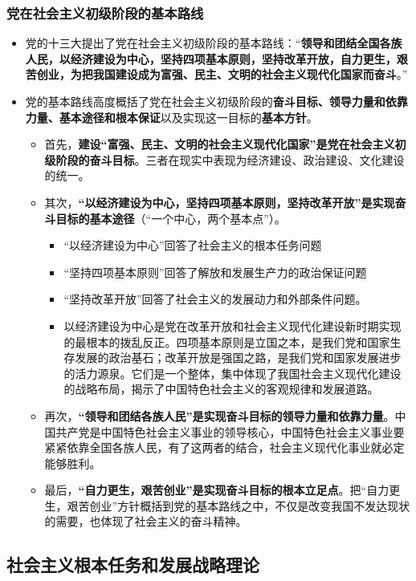 \documentclass[12pt,openany]{ctexbook}
\begin{document}
\subsubsection{党在社会主义初级阶段的基本路线}
\begin{itemize}
  \item 党的十三大提出了党在社会主义初级阶段的基本路线：“\textbf{领导和团结全国各族人民，以经济建设为中心，坚持四项基本原则，坚持改革开放，自力更生，艰苦创业，为把我国建设成为富强、民主、文明的社会主义现代化国家而奋斗}。”
  \item 党的基本路线高度概括了党在社会主义初级阶段的\textbf{奋斗目标、领导力量和依靠力量、基本途径和根本保证}以及实现这一目标的\textbf{基本方针}。
\begin{itemize}
  \item 首先，\textbf{建设“富强、民主、文明的社会主义现代化国家”是党在社会主义初级阶段的奋斗目标}。三者在现实中表现为经济建设、政治建设、文化建设的统一。
  \item 其次，\textbf{“以经济建设为中心，坚持四项基本原则，坚持改革开放”是实现奋斗目标的基本途径}（“一个中心，两个基本点”）。
\begin{itemize}
  \item “以经济建设为中心”回答了社会主义的根本任务问题
  \item “坚持四项基本原则”回答了解放和发展生产力的政治保证问题
  \item “坚持改革开放”回答了社会主义的发展动力和外部条件问题。
  \item 以经济建设为中心是党在改革开放和社会主义现代化建设新时期实现的最根本的拨乱反正。四项基本原则是立国之本，是我们党和国家生存发展的政治基石；改革开放是强国之路，是我们党和国家发展进步的活力源泉。它们是一个整体，集中体现了我国社会主义现代化建设的战略布局，揭示了中国特色社会主义的客观规律和发展道路。
\end{itemize}
  \item 再次，\textbf{“领导和团结各族人民”是实现奋斗目标的领导力量和依靠力量}。中国共产党是中国特色社会主义事业的领导核心，中国特色社会主义事业要紧紧依靠全国各族人民，有了这两者的结合，社会主义现代化事业就必定能够胜利。
  \item 最后，\textbf{“自力更生，艰苦创业”是实现奋斗目标的根本立足点}。把“自力更生，艰苦创业”方针概括到党的基本路线之中，不仅是改变我国不发达现状的需要，也体现了社会主义的奋斗精神。
\end{itemize}
\end{itemize}
\subsection{社会主义根本任务和发展战略理论}
\end{document}
